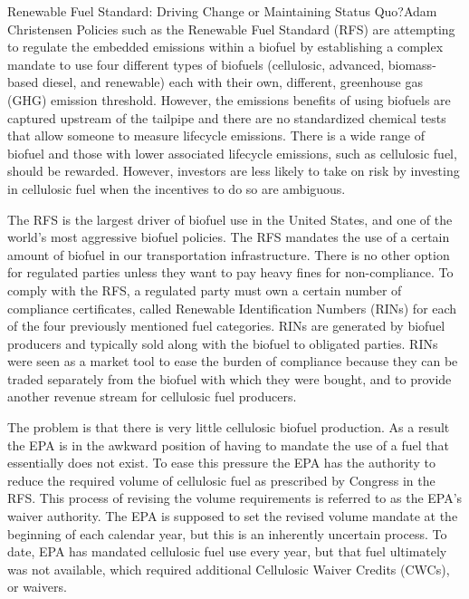 \documentclass[10pt]{papertex}
\begin{document}
\begin{news}{2}{Renewable Fuel Standard: Driving Change or Maintaining Status 
    Quo?}{Adam Christensen}{}{}
Policies such as the Renewable Fuel Standard (RFS) are attempting to regulate 
the embedded emissions within a biofuel by establishing a complex mandate to 
use four different types of biofuels (cellulosic, advanced, biomass-based 
diesel, and renewable) each with their own, different, greenhouse gas (GHG) 
emission threshold. However, the emissions benefits of using biofuels are 
captured upstream of the tailpipe and there are no standardized chemical tests 
that allow someone to measure lifecycle emissions. There is a wide range of 
biofuel and those with lower associated lifecycle emissions, such as cellulosic 
fuel, should be rewarded. However, investors are less likely to take on risk 
by investing in cellulosic fuel when the incentives to do so are ambiguous.

The RFS is the largest driver of biofuel use in the United States, and one of 
the world’s most aggressive biofuel policies. The RFS mandates the use of a 
certain amount of biofuel in our transportation infrastructure. There is no 
other option for regulated parties unless they want to pay heavy fines for 
non-compliance. To comply with the RFS, a regulated party must own a certain 
number of compliance certificates, called Renewable Identification Numbers 
(RINs) for each of the four previously mentioned fuel categories. RINs are 
generated by biofuel producers and typically sold along with the biofuel to 
obligated parties. RINs were seen as a market tool to ease the burden of 
compliance because they can be traded separately from the biofuel with which 
they were bought, and to provide another revenue stream for cellulosic fuel 
producers.

The problem is that there is very little cellulosic biofuel production. As a 
result the EPA is in the awkward position of having to mandate the use of a 
fuel that essentially does not exist. To ease this pressure the EPA has the 
authority to reduce the required volume of cellulosic fuel as prescribed by 
Congress in the RFS. This process of revising the volume requirements is 
referred to as the EPA’s waiver authority. The EPA is supposed to set the 
revised volume mandate at the beginning of each calendar year, but this is an 
inherently uncertain process. To date, EPA has mandated cellulosic fuel use 
every year, but that fuel ultimately was not available, which required 
additional Cellulosic Waiver Credits (CWCs), or waivers.


\end{news}
\end{document}
